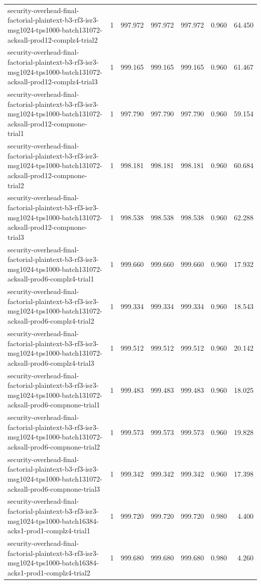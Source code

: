 \begin{tabular}{lrrrrrr}
security-overhead-final-factorial-plaintext-b3-rf3-isr3-msg1024-tps1000-batch131072-acksall-prod12-complz4-trial2 & 1 & 997.972 & 997.972 & 997.972 & 0.960 & 64.450 \\
security-overhead-final-factorial-plaintext-b3-rf3-isr3-msg1024-tps1000-batch131072-acksall-prod12-complz4-trial3 & 1 & 999.165 & 999.165 & 999.165 & 0.960 & 61.467 \\
security-overhead-final-factorial-plaintext-b3-rf3-isr3-msg1024-tps1000-batch131072-acksall-prod12-compnone-trial1 & 1 & 997.790 & 997.790 & 997.790 & 0.960 & 59.154 \\
security-overhead-final-factorial-plaintext-b3-rf3-isr3-msg1024-tps1000-batch131072-acksall-prod12-compnone-trial2 & 1 & 998.181 & 998.181 & 998.181 & 0.960 & 60.684 \\
security-overhead-final-factorial-plaintext-b3-rf3-isr3-msg1024-tps1000-batch131072-acksall-prod12-compnone-trial3 & 1 & 998.538 & 998.538 & 998.538 & 0.960 & 62.288 \\
security-overhead-final-factorial-plaintext-b3-rf3-isr3-msg1024-tps1000-batch131072-acksall-prod6-complz4-trial1 & 1 & 999.660 & 999.660 & 999.660 & 0.960 & 17.932 \\
security-overhead-final-factorial-plaintext-b3-rf3-isr3-msg1024-tps1000-batch131072-acksall-prod6-complz4-trial2 & 1 & 999.334 & 999.334 & 999.334 & 0.960 & 18.543 \\
security-overhead-final-factorial-plaintext-b3-rf3-isr3-msg1024-tps1000-batch131072-acksall-prod6-complz4-trial3 & 1 & 999.512 & 999.512 & 999.512 & 0.960 & 20.142 \\
security-overhead-final-factorial-plaintext-b3-rf3-isr3-msg1024-tps1000-batch131072-acksall-prod6-compnone-trial1 & 1 & 999.483 & 999.483 & 999.483 & 0.960 & 18.025 \\
security-overhead-final-factorial-plaintext-b3-rf3-isr3-msg1024-tps1000-batch131072-acksall-prod6-compnone-trial2 & 1 & 999.573 & 999.573 & 999.573 & 0.960 & 19.828 \\
security-overhead-final-factorial-plaintext-b3-rf3-isr3-msg1024-tps1000-batch131072-acksall-prod6-compnone-trial3 & 1 & 999.342 & 999.342 & 999.342 & 0.960 & 17.398 \\
security-overhead-final-factorial-plaintext-b3-rf3-isr3-msg1024-tps1000-batch16384-acks1-prod1-complz4-trial1 & 1 & 999.720 & 999.720 & 999.720 & 0.980 & 4.400 \\
security-overhead-final-factorial-plaintext-b3-rf3-isr3-msg1024-tps1000-batch16384-acks1-prod1-complz4-trial2 & 1 & 999.680 & 999.680 & 999.680 & 0.980 & 4.260 \\

\end{tabular}
